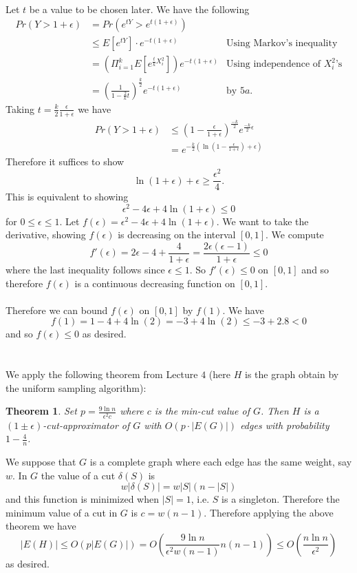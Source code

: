 \documentclass[letterpaper,12pt,oneside,onecolumn]{article}
\newtheorem{theorem}[fact]{Theorem}
\begin{document}
\paragraph{}
Let $t$ be a value to be chosen later. We have the following
\begin{align*}
Pr(Y > 1+\epsilon) &= Pr(e^{tY}> e^{t(1+\epsilon)} )\\
&\leq E[e^{tY}]\cdot e^{-t(1+\epsilon)}  &\text{Using Markov's inequality} \\
&= (\Pi_{i=1}^k E[e^{\frac{t}{k}X_i^2}])e^{-t(1+\epsilon)} &\text{Using independence of $X_i^2$'s} \\
&=(\frac{1}{1-\frac{2}{k}t})^{\frac{k}{2}}e^{-t(1+\epsilon)} &\text{by $5a$}.
\end{align*}
Taking $t=\frac{k}{2}\frac{\epsilon}{1+\epsilon}$ we have
\begin{align*}
Pr(Y>1+\epsilon) &\leq (1 - \frac{\epsilon}{1+\epsilon})^\frac{-k}{2}e^{\frac{-k}{2}\epsilon}\\
&=e^{-\frac{k}{2}(\ln(1-\frac{\epsilon}{1+\epsilon}) + \epsilon)}
\end{align*}
Therefore it suffices to show $$\ln(1+\epsilon) + \epsilon \geq \frac{\epsilon^2}{4}.$$
This is equivalent to showing
$$\epsilon^2 - 4\epsilon +4\ln(1+\epsilon) \leq 0$$
for $0 \leq \epsilon \leq 1$.
Let $f(\epsilon) = \epsilon^2 - 4\epsilon +4\ln(1+\epsilon)$. We want to take the derivative, showing $f(\epsilon)$ is decreasing on the interval $[0,1]$.
We compute
$$f'(\epsilon) = 2\epsilon - 4 + \frac{4}{1+\epsilon} = \frac{2\epsilon(\epsilon-1)}{1+\epsilon} \leq 0$$
where the last inequality follows since $\epsilon \leq 1$. So $f'(\epsilon) \leq 0$ on $[0,1]$ and so therefore $f(\epsilon)$ is a continuous decreasing function on $[0,1]$.
\paragraph{}
Therefore we can bound $f(\epsilon)$ on $[0,1]$ by $f(1)$. We have
$$f(1) = 1 - 4 + 4\ln(2) = -3 + 4\ln(2) \leq -3 +2.8 <0$$
and so $f(\epsilon) \leq 0$ as desired.
\newpage
\section{}
\paragraph{}
We apply the following theorem from Lecture $4$ (here $H$ is the graph obtain by the uniform sampling algorithm):
\begin{theorem}
	Set $p=\frac{9\ln n}{\epsilon^2 c}$ where $c$ is the min-cut value of $G$. Then $H$ is a $(1\pm \epsilon)$-cut-approximator of $G$ with $O(p\cdot |E(G)|)$ edges with probability $1-\frac{4}{n}$.
\end{theorem}
We suppose that $G$ is a complete graph where each edge has the same weight, say $w$. In $G$ the value of a cut $\delta(S)$ is
$$w|\delta(S)| = w|S|(n-|S|)$$
and this function is minimized when $|S| = 1$, i.e. $S$ is a singleton. Therefore the minimum value of a cut in $G$ is $c = w(n-1)$. Therefore applying the above theorem we have
$$|E(H)| \leq O(p|E(G)|) = O(\frac{9\ln n}{\epsilon^2 w (n-1)}n(n-1)) \leq O(\frac{n\ln n}{\epsilon^2})$$
as desired.
\end{document}
